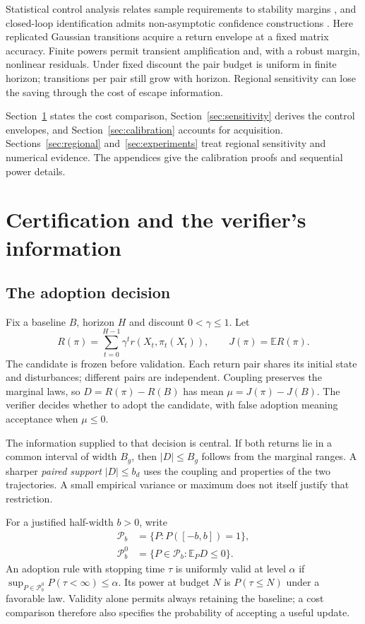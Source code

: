 \documentclass[twocolumn,nameyear]{autart}
\begin{document}
Statistical control analysis relates sample requirements to stability margins
\citep{gatsis2021statistical}, and closed-loop identification admits
non-asymptotic confidence constructions
\citep{szentpeteri2023nonasymptotic}. Here replicated Gaussian transitions
acquire a return envelope at a fixed matrix accuracy. Finite powers
permit transient amplification and, with a robust margin, nonlinear
residuals. Under fixed discount the pair budget is uniform in finite
horizon; transitions per pair still grow with horizon. Regional
sensitivity can lose the saving through the cost of escape information.

Section~\ref{sec:certification} states the cost comparison,
Section~\ref{sec:sensitivity} derives the control envelopes, and
Section~\ref{sec:calibration} accounts for acquisition.
Sections~\ref{sec:regional} and~\ref{sec:experiments} treat regional
sensitivity and numerical evidence. The appendices give the calibration
proofs and sequential power details.

\section{Certification and the verifier's information}\label{sec:certification}
\subsection{The adoption decision}
Fix a baseline $B$, horizon $H$ and discount $0<\gamma\le1$. Let
\[
 R(\pi)=\sum_{t=0}^{H-1}\gamma^t r(X_t,\pi_t(X_t)),
 \qquad J(\pi)=\mathbb{E}R(\pi).
\]
The candidate is frozen before validation. Each return pair shares its
initial state and disturbances; different pairs are independent.
Coupling preserves the marginal laws, so $D=R(\pi)-R(B)$ has mean
$\mu=J(\pi)-J(B)$. The verifier decides whether to adopt the candidate,
with false adoption meaning acceptance when $\mu\le0$.

The information supplied to that decision is central. If both returns
lie in a common interval of width $B_g$, then $|D|\le B_g$ follows
from the marginal ranges. A sharper \emph{paired support} $|D|\le b_d$
uses the coupling and properties of the two trajectories. A small
empirical variance or maximum does not itself justify that restriction.

For a justified half-width $b>0$, write
\begin{align*}
 \mathcal P_b&=\{P:P([-b,b])=1\},\\
 \mathcal P_b^0&=\{P\in\mathcal P_b:\mathbb{E}_PD\le0\}.
\end{align*}
An adoption rule with stopping time $\tau$ is uniformly valid at level
$\alpha$ if $\sup_{P\in\mathcal P_b^0}P(\tau<\infty)\le\alpha$.
Its power at budget $N$ is $P(\tau\le N)$ under a favorable law.
Validity alone permits always retaining the baseline; a cost comparison
therefore also specifies the probability of accepting a useful update.
\end{document}
